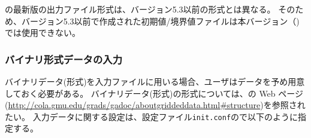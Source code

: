 {\scalelib}の最新版の出力ファイル形式は、バージョン5.3以前の形式とは異なる。
そのため、バージョン5.3以前で作成された初期値/境界値ファイルは本バージョン（{\scalelib}{\version})では使用できない。

\subsubsection{バイナリ形式データの入力} \label{sec:datainput_grads}

バイナリデータ({\grads}形式)を入力ファイルに用いる場合、ユーザはデータを予め用意しておく必要がある。
バイナリデータ({\grads}形式)の形式については、\grads の Web ページ
(\url{http://cola.gmu.edu/grads/gadoc/aboutgriddeddata.html#structure})を参照されたい。
入力データに関する設定は、設定ファイル\verb|init.conf|ので以下のように指定する。\\

